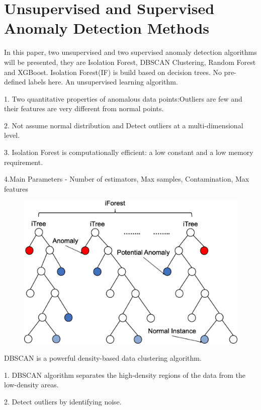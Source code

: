 \section{Unsupervised and Supervised Anomaly Detection Methods} \label{sec-method}
In this paper, two unsupervised and two supervised anomaly detection algorithms will be presented, they are Isolation Forest, DBSCAN Clustering, Random Forest and XGBoost.
Isolation Forest(IF) is build based on decision trees. No pre-defined labels here. An
unsupervised learning algorithm.

1. Two quantitative properties of anomalous data points:Outliers are few and their
features are very different from normal points.

2. Not assume normal distribution and Detect outliers at a multi-dimensional level.

3. Isolation Forest is computationally efficient: a low constant and a low memory
requirement.

4.Main Parameters - Number of estimators, Max samples, Contamination, Max features
	\begin{figure}[H]
	\centering
{}
\includegraphics[scale=0.2]{iforest.eps}
\end{figure}
DBSCAN is a powerful density-based data clustering algorithm.

1. DBSCAN algorithm separates the high-density regions of the data from the low-density areas.

2. Detect outliers by identifying noise.

